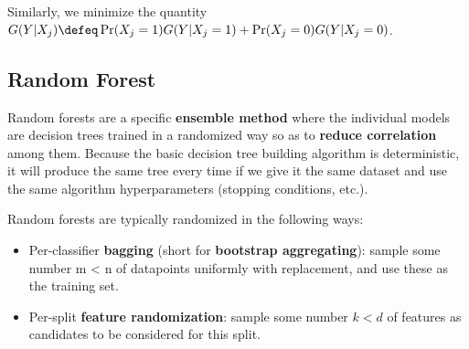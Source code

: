 Similarly, we minimize the quantity $G(Y|X_j)\defeq\Pr(X_j=1)G(Y|X_j=1)+\Pr(X_j=0)G(Y|X_j=0)$.

\subsection{Random Forest}
Random forests are a specific \textbf{ensemble method} where the individual models are decision trees trained in a randomized way so as to \textbf{reduce correlation} among them.
Because the basic decision tree building algorithm is deterministic, it will produce the same tree every time if we give it the same dataset and use the same algorithm hyperparameters (stopping conditions, etc.).

Random forests are typically randomized in the following ways:
\begin{itemize}
	\item 
		Per-classifier \textbf{bagging} (short for \textbf{bootstrap aggregating}): sample some number m < n of datapoints uniformly with replacement, and use these as the training set.
	\item
		Per-split \textbf{feature randomization}: sample some number  $k < d$ of features as candidates to be considered for this split.
\end{itemize}

